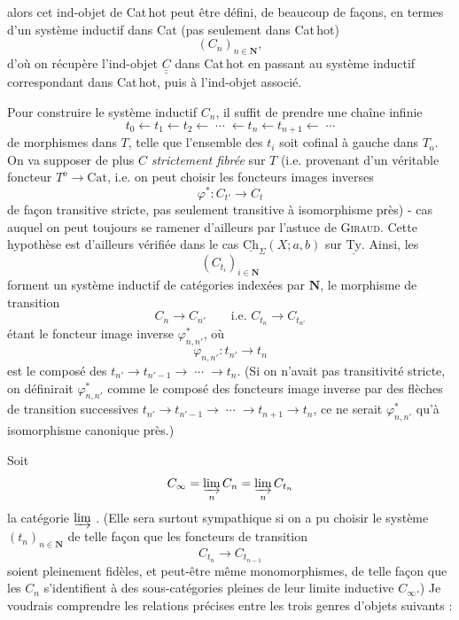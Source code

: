 \documentclass[11pt]{article}
\newcommand{\printedpage}[1]{\marginpar{\footnotesize p.~#1}}
\newcommand{\msp}[1]{\marginpar{\vspace*{10pt}\footnotesize [#1]}}
\newcommand{\uTy}{\underline{\mathrm{Ty}}}
\newcommand{\uCh}{\underline{\mathrm{Ch}}}
\newcommand{\Cat}{\mathrm{Cat}}
\newcommand{\To}{T_{\mathrm{o}}}
\begin{document}
alors cet ind-objet de Cat\,hot peut être défini, de beaucoup de façons, en termes
\msp{page 101}
d'un système inductif dans Cat (pas seulement dans Cat\,hot)
\[
(C_{n})_{n\in\mathbf{N}},
\]
d'où on récupère l'ind-objet $\underline{\underline{C}}$ dans Cat\,hot en passant au système inductif correspondant dans Cat\,hot, puis à l'ind-objet associé.

Pour construire le système inductif $C_{n}$, il suffit de prendre une chaîne infinie
\[
t_{0} \longleftarrow t_{1} \longleftarrow t_{2} \longleftarrow \;\cdots\; \longleftarrow t_{n} \longleftarrow t_{n+1} \longleftarrow \;\cdots
\]
de morphismes dans $T$, telle que l'ensemble des $t_{i}$ soit cofinal à gauche dans $\To$. On va supposer de plus $C$ \textit{strictement fibrée} sur $T$ (i.e. provenant d'un véritable foncteur $T^{o} \longrightarrow \Cat$, i.e. on peut choisir les foncteurs images inverses
\[
\varphi^{*} : C_{t'} \longrightarrow C_{t}
\]
de façon transitive stricte, pas seulement transitive à isomorphisme près) - cas auquel on peut toujours se ramener d'ailleurs par l'astuce de \textsc{Giraud}. Cette hypothèse est d'ailleurs vérifiée dans le cas $\uCh_{\Sigma}(X;a,b)$ sur $\uTy$. Ainsi, les
\[
(C_{t_{i}})_{i\in\mathbf{N}}
\]
forment un système inductif de catégories indexées par $\mathbf{N}$, le morphisme de transition
\[
C_{n} \longrightarrow C_{n'} \qquad \text{i.e. } C_{t_{n}} \longrightarrow C_{t_{n'}}
\]
\printedpage{66}
\msp{page 102}
étant le foncteur image inverse $\varphi^{*}_{n,n'}$, où
\[
\varphi_{n,n'} : t_{n'} \longrightarrow t_{n}
\]
est le composé des $t_{n'} \longrightarrow t_{n'-1} \longrightarrow \;\cdots\; \longrightarrow t_{n}$. (Si on n'avait pas transitivité stricte, on définirait $\varphi^{*}_{n,n'}$ comme le composé des foncteurs image inverse par des flèches de transition successives $t_{n'} \longrightarrow t_{n'-1} \longrightarrow \;\cdots\; \longrightarrow t_{n+1} \longrightarrow t_{n}$, ce ne serait $\varphi^{*}_{n,n'}$ qu'à isomorphisme canonique près.)

Soit
\[
C_{\infty} = \varinjlim_{n} C_{n} = \varinjlim_{n} C_{t_{n}}
\]
la catégorie $\varinjlim$ . (Elle sera surtout sympathique si on a pu choisir le système $(t_{n})_{n\in\mathbf{N}}$ de telle façon que les foncteurs de transition
\[
C_{t_{n}} \longrightarrow C_{t_{n-1}}
\]
soient pleinement fidèles, et peut-être même monomorphismes, de telle façon que les $C_{n}$ s'identifient à des sous-catégories pleines de leur limite inductive $C_{\infty}$.) Je voudrais comprendre les relations précises entre les trois genres d'objets suivants :
\end{document}
